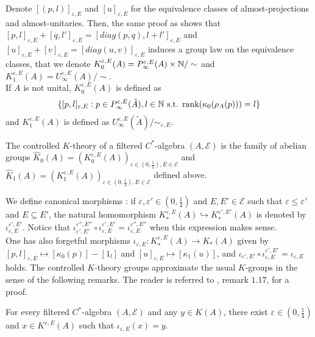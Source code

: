 Denote $[(p,l)]_{\varepsilon,E}$ and $[u]_{\varepsilon,E}$ for the equivalence classes of almost-projections and almost-unitaries. Then, the same proof as \cite{OY2} shows that $[p,l]_{\varepsilon,E}+[q,l']_{\varepsilon,E}=[diag(p,q),l+l']_{\varepsilon,E}$ and $[u]_{\varepsilon,E}+[v]_{\varepsilon,E}=[diag(u,v)]_{\varepsilon,E}$ induces a group law on the equivalence classes, that we denote $K_0^{\varepsilon,E}(A) = P^{\varepsilon, E}_\infty(A)\times \mathbb N / \sim$ and $K_1^{\varepsilon,E}(A) = U^{\varepsilon, E}_\infty(A) / \sim$.\\

If $A$ is not unital, $K_0^{\varepsilon,E}(A)$ is defined as
\[\{[p,l]_{\varepsilon,E} : p\in P^{\varepsilon,E}_\infty (\tilde A), l\in \mathbb N \text{ s.t. rank}(\kappa_0(\rho_A(p)))=l \}\]
and $K_1^{\varepsilon,E}(A)$ is defined as $U_\infty^{\varepsilon,E}(\tilde A)/ \sim_{\varepsilon,E}$.\\

\begin{definition}
The controlled $K$-theory of a filtered $C^*$-algebra $(A,\mathcal E)$ is the family of abelian groups $\hat K_0(A) = (K_0^{\varepsilon,E}(A))_{\varepsilon\in (0,\frac{1}{4}),E\in\mathcal E}$ and $\hat K_1(A) = (K_1^{\varepsilon,E}(A))_{\varepsilon\in (0,\frac{1}{4}),E\in\mathcal E}$ defined above.\\
\end{definition}

We define canonical morphisms : if $\varepsilon, \varepsilon'\in (0,\frac{1}{4})$ and $E,E'\in\mathcal E$ such that $\varepsilon \leq \varepsilon'$ and $E \subseteq E'$, the natural homomorphism $K_*^{\varepsilon,E}(A)\hookrightarrow K_*^{\varepsilon',E'}(A)$ is denoted by $\iota_{\varepsilon,E}^{\varepsilon',E'}$. Notice that $\iota_{\varepsilon',E'}^{\varepsilon'',E''}\circ\iota_{\varepsilon,E}^{\varepsilon',E'}=\iota_{\varepsilon,E}^{\varepsilon'',E''}$ when this expression makes sense.\\

One has also forgetful morphisms $\iota_{\varepsilon,E} : K_*^{\varepsilon,E}(A)\rightarrow K_*(A)$ given by $[p,l]_{\varepsilon,E} \mapsto [\kappa_0(p)]-[1_l]$ and $[u]_{\varepsilon,E} \mapsto [\kappa_1(u)] $, and 
$\iota_{\varepsilon',E'}\circ\iota_{\varepsilon,E}^{\varepsilon',E'}=\iota_{\varepsilon, E}$ holds. The controlled $K$-theory groups approximate the usual $K$-groups in the sense of the following remarks. The reader is referred to \cite{OY2}, remark $1.17$, for a proof.

\begin{rk}
For every filtered $C^*$-algebra $(A,\mathcal E)$ and any $y\in K(A)$, there exist $\varepsilon\in (0,\frac{1}{4})$ and $x\in K^{\varepsilon,E}(A)$ such that $\iota_{\varepsilon,E}(x) = y$.
\end{rk}

